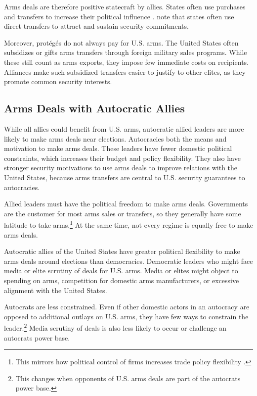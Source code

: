 \documentclass[12pt]{article}
\begin{document}
Arms deals are therefore positive statecraft by allies. 
States often use purchases and transfers to increase their political influence \citep[pg. 42-3]{Baldwin2020}.
\citet[pg. 184-5]{IkenberryGrieco2003} note that states often use direct transfers to attract and sustain security commitments.  


Moreover, prot{\'e}g{\'e}s do not always pay for U.S. arms.
The United States often subsidizes or gifts arms transfers through foreign military sales programs. 
While these still count as arms exports, they impose few immediate costs on recipients.
Alliances make such subsidized transfers easier to justify to other elites, as they promote common security interests. 


\subsection{Arms Deals with Autocratic Allies}


While all allies could benefit from U.S. arms, autocratic allied leaders are more likely to make arms deals near elections. 
Autocracies both the means and motivation to make arms deals.
These leaders have fewer domestic political constraints, which increases their budget and policy flexibility. 
They also have stronger security motivations to use arms deals to improve relations with the United States, because arms transfers are central to U.S. security guarantees to autocracies.


Allied leaders must have the political freedom to make arms deals.
Governments are the customer for most arms sales or transfers, so they generally have some latitude to take arms.\footnote{This mirrors how political control of firms increases trade policy flexibility \citep{Davisetal2019}.}
At the same time, not every regime is equally free to make arms deals. 


Autocratic allies of the United States have greater political flexibility to make arms deals around elections than democracies. 
Democratic leaders who might face media or elite scrutiny of deals for U.S. arms.
Media or elites might object to spending on arms, competition for domestic arms manufacturers, or excessive alignment with the United States.


Autocrats are less constrained.
Even if other domestic actors in an autocracy are opposed to additional outlays on U.S. arms, they have few ways to constrain the leader.\footnote{This changes when opponents of U.S. arms deals are part of the autocrats power base.}
Media scrutiny of deals is also less likely to occur or challenge an autocrats power base. 
\end{document}

